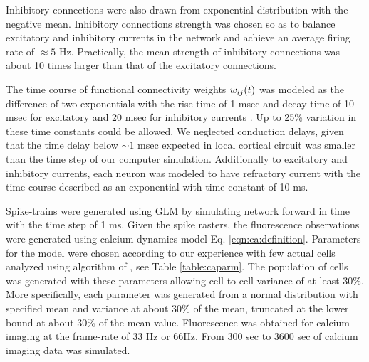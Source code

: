 Inhibitory connections were also drawn from exponential distribution with the negative mean. Inhibitory connections strength was chosen so as to balance excitatory and inhibitory currents in the network and achieve an average firing rate of  $\approx 5 $ Hz. Practically, the mean strength of inhibitory connections was about 10 times larger than that of the excitatory connections.

The time course of functional connectivity weights $w_{ij}(t)$ was modeled as the difference of two exponentials with the rise time of 1 msec and decay time of 10 msec for excitatory and 20 msec for inhibitory currents \cite{Sayer1990}. Up to 25\% variation in these time constants could be allowed. We neglected conduction delays, given that the time delay below $\sim 1$ msec expected in local cortical circuit was smaller than the time step of our computer simulation.  Additionally to excitatory and inhibitory currents, each neuron was modeled to have refractory current with the time-course described as an exponential with time constant of 10 ms.

Spike-trains were generated using GLM by simulating network forward in time with the time step of 1 ms.  Given the spike rasters, the fluorescence observations were generated using calcium dynamics model Eq. \ref{eqn:ca:definition}. Parameters for the model were chosen according to our experience with few actual cells analyzed using algorithm of \cite{Vogelstein2009}, see Table \ref{table:caparm}.  The population of cells was generated with these parameters allowing cell-to-cell variance of at least 30\%. 
More specifically, each parameter was generated from a normal distribution with specified mean and variance at about 30\% of the mean, truncated at the lower bound at about 30\% of the mean value. Fluorescence was obtained for calcium imaging at the frame-rate of 33 Hz or 66Hz.  From 300 sec to 3600 sec of calcium imaging data was simulated.


